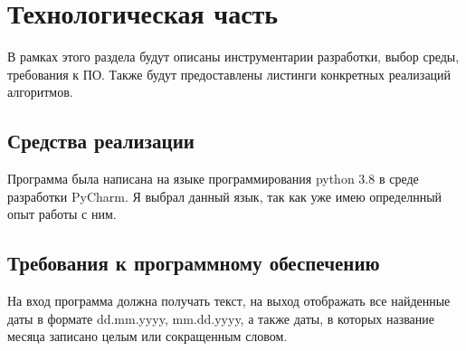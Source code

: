 \documentclass[a4paper, 14pt]{article}
\begin{document}
        \section{Технологическая часть}
        
        В рамках этого раздела будут описаны инструментарии разработки, выбор среды, требования к ПО. Также будут предоставлены листинги конкретных реализаций алгоритмов.\\
		\subsection{Средства реализации}
		Программа была написана на языке программирования python 3.8 в среде разработки PyCharm. Я выбрал данный язык, так как уже имею определнный опыт работы с ним.\\
		\subsection{Требования к программному обеспечению}
		На вход программа должна получать текст, на выход отображать все найденные даты в формате dd.mm.yyyy, mm.dd.yyyy, а также даты, в которых название месяца записано целым или сокращенным словом.
		
\end{document}
